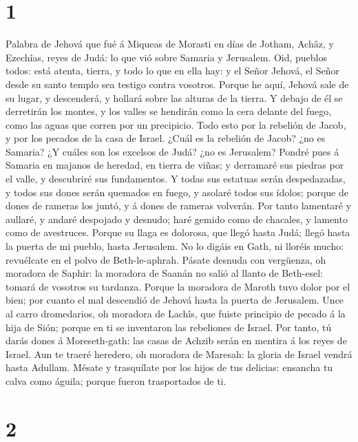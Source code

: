\hypertarget{section}{%
\section{1}\label{section}}

 Palabra de Jehová que fué á Miqueas de Morasti en días de
Jotham, Achâz, y Ezechîas, reyes de Judá: lo que vió sobre Samaria y
Jerusalem.  Oid, pueblos todos: está atenta, tierra, y todo
lo que en ella hay: y el Señor Jehová, el Señor desde su santo templo
sea testigo contra vosotros.  Porque he aquí, Jehová sale de
su lugar, y descenderá, y hollará sobre las alturas de la tierra.
 Y debajo de él se derretirán los montes, y los valles se
hendirán como la cera delante del fuego, como las aguas que corren por
un precipicio.  Todo esto por la rebelión de Jacob, y por
los pecados de la casa de Israel. ¿Cuál es la rebelión de Jacob? ¿no es
Samaria? ¿Y cuáles son los excelsos de Judá? ¿no es Jerusalem?
 Pondré pues á Samaria en majanos de heredad, en tierra de
viñas; y derramaré sus piedras por el valle, y descubriré sus
fundamentos.  Y todas sus estatuas serán despedazadas, y
todos sus dones serán quemados en fuego, y asolaré todos sus ídolos;
porque de dones de rameras los juntó, y á dones de rameras volverán.
 Por tanto lamentaré y aullaré, y andaré despojado y
desnudo; haré gemido como de chacales, y lamento como de avestruces.
 Porque su llaga es dolorosa, que llegó hasta Judá; llegó
hasta la puerta de mi pueblo, hasta Jerusalem.  No lo
digáis en Gath, ni lloréis mucho: revuélcate en el polvo de
Beth-le-aphrah.  Pásate desnuda con vergüenza, oh moradora
de Saphir: la moradora de Saanán no salió al llanto de Beth-esel: tomará
de vosotros su tardanza.  Porque la moradora de Maroth tuvo
dolor por el bien; por cuanto el mal descendió de Jehová hasta la puerta
de Jerusalem.  Unce al carro dromedarios, oh moradora de
Lachîs, que fuiste principio de pecado á la hija de Sión; porque en ti
se inventaron las rebeliones de Israel.  Por tanto, tú
darás dones á Moreseth-gath: las casas de Achzib serán en mentira á los
reyes de Israel.  Aun te traeré heredero, oh moradora de
Maresah: la gloria de Israel vendrá hasta Adullam.  Mésate
y trasquílate por los hijos de tus delicias: ensancha tu calva como
águila; porque fueron trasportados de ti.

\hypertarget{section-1}{%
\section{2}\label{section-1}}


